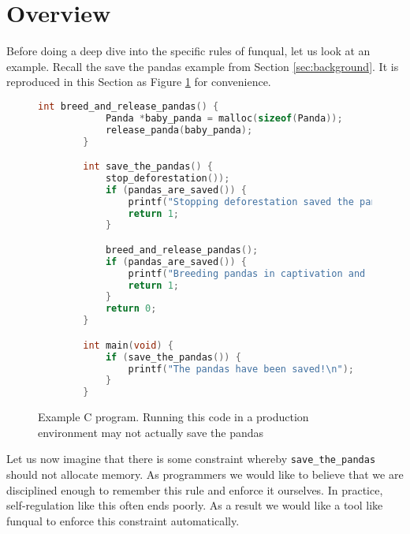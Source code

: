 \section{Overview}\label{sec:rules:overview}

Before doing a deep dive into the specific rules of funqual, let us look at an example.  Recall the save the pandas example from Section \ref{sec:background}.  It is reproduced in this Section as Figure \ref{lst:rules:pandasource} for convenience.  

\begin{figure}
    \begin{lstlisting}[language=C,gobble=8]
        int breed_and_release_pandas() {
            Panda *baby_panda = malloc(sizeof(Panda));
            release_panda(baby_panda);
        }

        int save_the_pandas() {
            stop_deforestation());
            if (pandas_are_saved()) {
                printf("Stopping deforestation saved the pandas!\n");
                return 1;
            }

            breed_and_release_pandas();
            if (pandas_are_saved()) {
                printf("Breeding pandas in captivation and releasing them has saved the pandas!\n");
                return 1;
            }
            return 0;
        }

        int main(void) {
            if (save_the_pandas()) {
                printf("The pandas have been saved!\n");
            }
        }
    \end{lstlisting}
    \caption{Example C program.  Running this code in a production environment may not actually save the pandas}
    \label{lst:rules:pandasource}
\end{figure}

Let us now imagine that there is some constraint whereby \lstinline{save_the_pandas} should not allocate memory. As programmers we would like to believe that we are disciplined enough to remember this rule and enforce it ourselves. In practice, self-regulation like this often ends poorly. As a result we would like a tool like funqual to enforce this constraint automatically.

